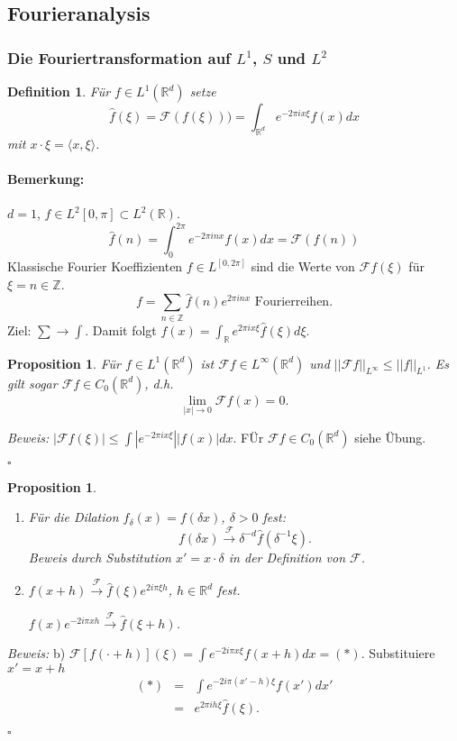 \documentclass[12pt,a4paper,titlepage]{scrartcl}
\newtheorem{Definition}[Satz]{Definition}
\newtheorem{Prop}[Satz]{Proposition}
\numberwithin{equation}{section}
\newcommand{\R}{\mathbb{R}} %
\newcommand{\Z}{\mathbb{Z}} %
\newcommand{\f}{\hat{f}}
\newcommand{\F}{\mathcal{F}}
\newcommand{\m}{\cdot}
\newcommand{\Bew}{\emph{Beweis: }}
\newcommand{\qed}{\begin{flushright}
		$\square$
	\end{flushright}}
\begin{document}
	\newpage
	\subsection{Fourieranalysis}
	
	\subsubsection{Die Fouriertransformation auf $L^1$, $S$ und $L^2$}
	
	\begin{Definition}
		Für $f\in L^1(\R^d)$ setze 
		$$\f(\xi) = \F(f(\xi))) = \int_{\R^d} e^{-2\pi ix\xi}f(x)dx$$
		mit $x\m \xi = \langle x,\xi\rangle$.
	\end{Definition}
	
	\paragraph{Bemerkung:} $d = 1$, $f\in L^2[0,\pi]\subset L^2(\R)$.
	$$\f(n) = \int_{0}^{2\pi} e^{-2\pi i n x}f(x) dx = \F(f(n))$$
	Klassische Fourier Koeffizienten $f\in L^[0,2\pi]$ sind die Werte von $\F f(\xi)$ für $\xi = n\in \Z$.
	$$f= \sum_{n \in \Z} \f(n) e^{2\pi i n x} \text{ Fourierreihen.}$$
	Ziel: $\sum\rightarrow \int$. Damit folgt $f(x) = \int_{\R}e^{2\pi i x \xi}\f(\xi)d\xi$.
	
	\begin{Prop}
		Für $f\in L^1(\R^d)$ ist $\F f\in L^{\infty}(\R^d)$ und $||\F f||_{L^\infty}\leq ||f||_{L^1}$. Es gilt sogar $\F f\in C_0(\R^d)$, d.h. 
		$$\lim\limits_{|x|\rightarrow 0}\F f(x) = 0.$$
	\end{Prop}
	
	\Bew $|\F f(\xi)|\leq \int |e^{-2\pi i x\xi}| |f(x)| dx$. FÜr $\F f\in C_0(\R^d)$ siehe Übung.
	\qed
	
	\begin{Prop}
		~
		\begin{enumerate}
			\item[a)] Für die Dilation $f_\delta(x) = f(\delta x)$, $\delta>0$ fest:
			$$f(\delta x) \overset{\F}{\rightarrow} \delta^{-d}\f(\delta^{-1}\xi).$$
			Beweis durch Substitution $x' = x\m \delta$ in der Definition von $\F$.
			\item[b)] $f(x+h) \overset{\F}{\rightarrow} \f(\xi)e^{2i\pi \xi h}$, $h\in \R^d$ fest. 
			
			$f(x)e^{-2i\pi x h}\overset{\F}{\rightarrow} \f(\xi+h)$. 
		\end{enumerate}
	\end{Prop}
	\Bew b) $\F[f(\m+h)](\xi) = \int e^{-2i\pi x\xi}f(x+h) dx = (*)$. Substituiere $x' = x+h$
	\begin{eqnarray}
		(*) &=& \int e^{-2i\pi (x'-h)\xi}f(x')dx'\nonumber\\
		&=& e^{2\pi i h\xi}\f(\xi).\nonumber
	\end{eqnarray}
	\qed
	
\end{document}
